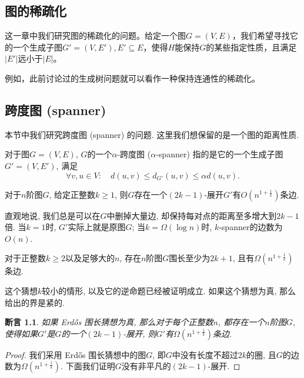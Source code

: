 \documentclass[lang=cn,newtx,10pt,scheme=chinese,chinesefont=nofont,citestyle=gb7714-2015, bibstyle=gb7714-2015]{elegantbook}
\newtheorem{claim}{断言}[chapter]   %
\begin{document}
\begin{refsection}
\chapter{图的稀疏化}

这一章中我们研究图的稀疏化的问题。给定一个图$G=(V,E)$，我们希望寻找它的一个生成子图$G'=(V,E'),E'\subseteq E$，使得$H$能保持$G$的某些指定性质，且满足$|E'|$远小于$|E|$。

例如，此前讨论过的生成树问题就可以看作一种保持连通性的稀疏化。




\section{跨度图 (spanner)}

本节中我们研究跨度图 (spanner) 的问题. 这里我们想保留的是一个图的距离性质.

\begin{definition}
    对于图$G=(V,E)$, $G$的一个$\alpha$-跨度图 ($\alpha$-spanner) 指的是它的一个生成子图$G'=(V,E')$, 满足
    \[
    \forall v,u\in V:\quad d(u,v)\le d_{G'}(u,v)\leq\alpha d(u,v).
    \]
\end{definition}

\begin{theorem}
\label{thm:multiplicative spanner}
    对于$n$阶图$G$, 给定正整数$k\ge 1$, 则$G$存在一个$(2k-1)$-展开$G'$有$O(n^{1
    +\frac{1}{k}})$条边.
\end{theorem}

直观地说, 我们总是可以在$G$中删掉大量边, 却保持每对点的距离至多增大到$2k-1$倍. 当$k=1$时, $G'$实际上就是原图$G$; 当$k=\Omega(\log n)$时, $k$-spanner的边数为$O(n)$.

\begin{conjecture}
    对于正整数$k\ge 2$以及足够大的$n$, 存在$n$阶图$G$围长至少为$2k+1$, 且有$\Omega(n^{1+\frac{1}{k}})$条边.
\end{conjecture}

这个猜想$k$较小的情形, 以及它的逆命题已经被证明成立. 如果这个猜想为真, 那么  给出的界是紧的.

\begin{claim}
    如果 Erdős 围长猜想为真, 那么对于每个正整数$n$, 都存在一个$n$阶图$G$, 使得如果$G'$是$G$的一个$(2k-1)$-展开, 则$G'$有$\Omega(n^{1+\frac{1}{k}})$条边.
\end{claim}

\begin{proof}
    我们采用 Erdős 围长猜想中的图$G$, 即$G$中没有长度不超过$2k$的圈, 且$G$的边数为$\Omega(n^{1+\frac{1}{k}})$. 下面我们证明$G$没有非平凡的$(2k-1)$-展开.


\end{proof}
\end{refsection}
\end{document}
